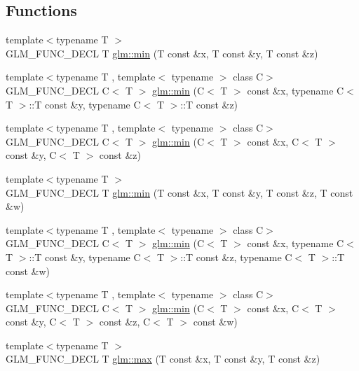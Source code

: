 \subsection*{Functions}
\begin{DoxyCompactItemize}
\item 
{\footnotesize template$<$typename T $>$ }\\G\+L\+M\+\_\+\+F\+U\+N\+C\+\_\+\+D\+E\+CL T \hyperlink{group__gtx__extended__min__max_ga713d3f9b3e76312c0d314e0c8611a6a6}{glm\+::min} (T const \&x, T const \&y, T const \&z)
\item 
{\footnotesize template$<$typename T , template$<$ typename $>$ class C$>$ }\\G\+L\+M\+\_\+\+F\+U\+N\+C\+\_\+\+D\+E\+CL C$<$ T $>$ \hyperlink{group__gtx__extended__min__max_ga74d1a96e7cdbac40f6d35142d3bcbbd4}{glm\+::min} (C$<$ T $>$ const \&x, typename C$<$ T $>$\+::T const \&y, typename C$<$ T $>$\+::T const \&z)
\item 
{\footnotesize template$<$typename T , template$<$ typename $>$ class C$>$ }\\G\+L\+M\+\_\+\+F\+U\+N\+C\+\_\+\+D\+E\+CL C$<$ T $>$ \hyperlink{group__gtx__extended__min__max_ga42b5c3fc027fd3d9a50d2ccc9126d9f0}{glm\+::min} (C$<$ T $>$ const \&x, C$<$ T $>$ const \&y, C$<$ T $>$ const \&z)
\item 
{\footnotesize template$<$typename T $>$ }\\G\+L\+M\+\_\+\+F\+U\+N\+C\+\_\+\+D\+E\+CL T \hyperlink{group__gtx__extended__min__max_ga95466987024d03039607f09e69813d69}{glm\+::min} (T const \&x, T const \&y, T const \&z, T const \&w)
\item 
{\footnotesize template$<$typename T , template$<$ typename $>$ class C$>$ }\\G\+L\+M\+\_\+\+F\+U\+N\+C\+\_\+\+D\+E\+CL C$<$ T $>$ \hyperlink{group__gtx__extended__min__max_ga4fe35dd31dd0c45693c9b60b830b8d47}{glm\+::min} (C$<$ T $>$ const \&x, typename C$<$ T $>$\+::T const \&y, typename C$<$ T $>$\+::T const \&z, typename C$<$ T $>$\+::T const \&w)
\item 
{\footnotesize template$<$typename T , template$<$ typename $>$ class C$>$ }\\G\+L\+M\+\_\+\+F\+U\+N\+C\+\_\+\+D\+E\+CL C$<$ T $>$ \hyperlink{group__gtx__extended__min__max_ga7471ea4159eed8dd9ea4ac5d46c2fead}{glm\+::min} (C$<$ T $>$ const \&x, C$<$ T $>$ const \&y, C$<$ T $>$ const \&z, C$<$ T $>$ const \&w)
\item 
{\footnotesize template$<$typename T $>$ }\\G\+L\+M\+\_\+\+F\+U\+N\+C\+\_\+\+D\+E\+CL T \hyperlink{group__gtx__extended__min__max_ga04991ccb9865c4c4e58488cfb209ce69}{glm\+::max} (T const \&x, T const \&y, T const \&z)

\end{DoxyCompactItemize}
